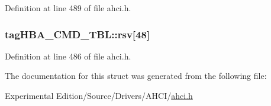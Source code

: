 Definition at line 489 of file ahci.\+h.

\subsubsection[{\texorpdfstring{rsv}{rsv}}]{ tag\+H\+B\+A\+\_\+\+C\+M\+D\+\_\+\+T\+B\+L\+::rsv\mbox{[}48\mbox{]}}\hypertarget{structtagHBA__CMD__TBL_a8d98e1762a624fbe9b7e510cf309046d}{}\label{structtagHBA__CMD__TBL_a8d98e1762a624fbe9b7e510cf309046d}


Definition at line 486 of file ahci.\+h.



The documentation for this struct was generated from the following file\+:\begin{DoxyCompactItemize}
\item 
Experimental Edition/\+Source/\+Drivers/\+A\+H\+C\+I/\hyperlink{ahci_8h}{ahci.\+h}\end{DoxyCompactItemize}
